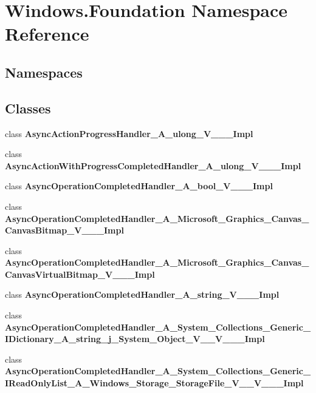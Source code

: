 \hypertarget{namespace_windows_1_1_foundation}{}\section{Windows.\+Foundation Namespace Reference}
\label{namespace_windows_1_1_foundation}
\subsection*{Namespaces}
\begin{DoxyCompactItemize}
\end{DoxyCompactItemize}
\subsection*{Classes}
\begin{DoxyCompactItemize}
\item 
class {\bfseries Async\+Action\+Progress\+Handler\+\_\+\+A\+\_\+ulong\+\_\+\+V\+\_\+\+\_\+\+\_\+\+Impl}
\item 
class {\bfseries Async\+Action\+With\+Progress\+Completed\+Handler\+\_\+\+A\+\_\+ulong\+\_\+\+V\+\_\+\+\_\+\+\_\+\+Impl}
\item 
class {\bfseries Async\+Operation\+Completed\+Handler\+\_\+\+A\+\_\+bool\+\_\+\+V\+\_\+\+\_\+\+\_\+\+Impl}
\item 
class {\bfseries Async\+Operation\+Completed\+Handler\+\_\+\+A\+\_\+\+Microsoft\+\_\+\+Graphics\+\_\+\+Canvas\+\_\+\+Canvas\+Bitmap\+\_\+\+V\+\_\+\+\_\+\+\_\+\+Impl}
\item 
class {\bfseries Async\+Operation\+Completed\+Handler\+\_\+\+A\+\_\+\+Microsoft\+\_\+\+Graphics\+\_\+\+Canvas\+\_\+\+Canvas\+Virtual\+Bitmap\+\_\+\+V\+\_\+\+\_\+\+\_\+\+Impl}
\item 
class {\bfseries Async\+Operation\+Completed\+Handler\+\_\+\+A\+\_\+string\+\_\+\+V\+\_\+\+\_\+\+\_\+\+Impl}
\item 
class {\bfseries Async\+Operation\+Completed\+Handler\+\_\+\+A\+\_\+\+System\+\_\+\+Collections\+\_\+\+Generic\+\_\+\+I\+Dictionary\+\_\+\+A\+\_\+string\+\_\+j\+\_\+\+System\+\_\+\+Object\+\_\+\+V\+\_\+\+\_\+\+V\+\_\+\+\_\+\+\_\+\+Impl}
\item 
class {\bfseries Async\+Operation\+Completed\+Handler\+\_\+\+A\+\_\+\+System\+\_\+\+Collections\+\_\+\+Generic\+\_\+\+I\+Read\+Only\+List\+\_\+\+A\+\_\+\+Windows\+\_\+\+Storage\+\_\+\+Storage\+File\+\_\+\+V\+\_\+\+\_\+\+V\+\_\+\+\_\+\+\_\+\+Impl}
\item 

\end{DoxyCompactItemize}
